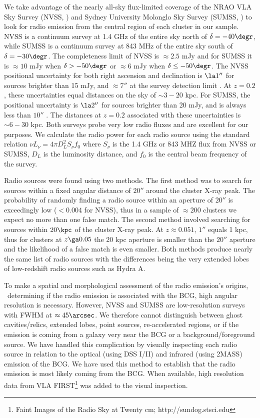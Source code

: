 \documentclass{emulateapj}
\begin{document}
We take advantage of the nearly all-sky flux-limited coverage of the
NRAO VLA Sky Survey (NVSS, \citealt{nvss}) and Sydney University
Molonglo Sky Survey (SUMSS, \citealt{sumss1, sumss2}) to look for
radio emission from the central region of each cluster in our sample.
NVSS is a continuum survey at 1.4 GHz of the entire sky north of
$\delta = -40\degr$, while SUMSS is a continuum survey at 843 MHz of
the entire sky south of $\delta = -30\degr$. The completeness limit of
NVSS is $\approx 2.5$ mJy and for SUMSS it is $\approx 10$ mJy when
$\delta > -50\degr$ or $\approx 6$ mJy when $\delta \leq -50\degr$.
The NVSS positional uncertainty for both right ascension and
declination is $\la 1''$ for sources brighter than 15 mJy, and
$\approx 7''$ at the survey detection limit \citep{nvss}. At $z=0.2$,
these uncertainties equal distances on the sky of $\sim3-20$ kpc. For
SUMSS, the positional uncertainty is $\la 2''$ for sources brighter
than 20 mJy, and is always less than $10''$ \citep{sumss1,sumss2}. The
distances at $z=0.2$ associated with these uncertainties is $\sim6-30$
kpc. Both surveys probe very low radio fluxes and are excellent for
our purposes. We calculate the radio power for each radio source using
the standard relation $\nu L_{\nu} = 4 \pi D_L^2 S_{\nu} f_0$ where
$S_{\nu}$ is the 1.4 GHz or 843 MHZ flux from NVSS or SUMSS, $D_L$ is
the luminosity distance, and $f_0$ is the central beam frequency of
the survey.

Radio sources were found using two methods. The first method was to
search for sources within a fixed angular distance of $20''$ around
the cluster X-ray peak. The probability of randomly finding a radio
source within an aperture of $20''$ is exceedingly low ($< 0.004$ for
NVSS), thus in a sample of $\approx 200$ clusters we expect no more
than one false match. The second method involved searching for sources
within $20\kpc$ of the cluster X-ray peak. At $z \approx 0.051$, $1''$
equals 1 kpc, thus for clusters at $z \ga 0.05$ the 20 kpc aperture is
smaller than the $20''$ aperture and the likelihood of a false match
is even smaller. Both methods produce nearly the same list of radio
sources with the differences being the very extended lobes of
low-redshift radio sources such as Hydra A.

To make a spatial and morphological assessment of the radio emission's
origins, \ie\ determining if the radio emission is associated with the
BCG, high angular resolution is necessary. However, NVSS and SUMSS are
low-resolution surveys with FWHM at $\approx 45\arcsec$. We therefore
cannot distinguish between ghost cavities/relics, extended lobes,
point sources, re-accelerated regions, or if the emission is coming
from a galaxy very near the BCG or a background/foreground source. We
have handled this complication by visually inspecting each radio
source in relation to the optical (using DSS I/II) and infrared (using
2MASS) emission of the BCG. We have used this method to establish that
the radio emission is most likely coming from the BCG. When available,
high resolution data from VLA FIRST\footnote{Faint Images of the Radio
 Sky at Twenty cm; http://sundog.stsci.edu} was added to the
visual inspection.
\end{document}
